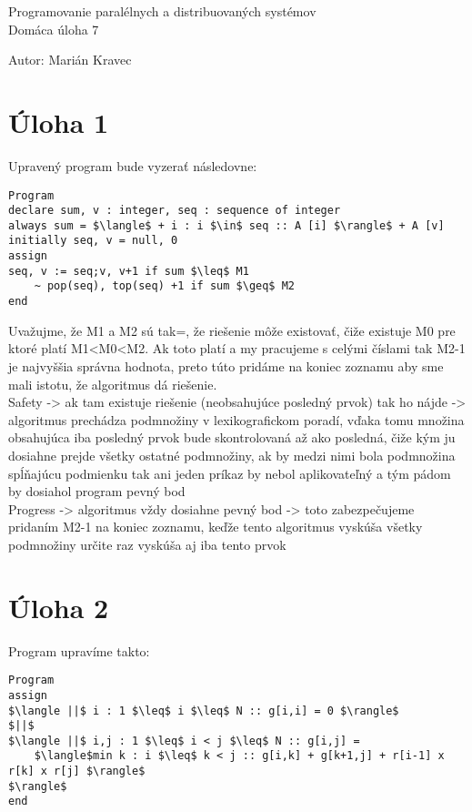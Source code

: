 \documentclass[a4paper]{article}
\begin{document}
 
	
\pagestyle{plain}

\begin{center}
	\sc\large
	Programovanie paralélnych a distribuovaných systémov\\
	Domáca úloha 7
\end{center}

Autor: Marián Kravec

\section{Úloha 1}

Upravený program bude vyzerať následovne:
\begin{lstlisting}
Program
declare sum, v : integer, seq : sequence of integer
always sum = $\langle$ + i : i $\in$ seq :: A [i] $\rangle$ + A [v]
initially seq, v = null, 0
assign
seq, v := seq;v, v+1 if sum $\leq$ M1
	~ pop(seq), top(seq) +1 if sum $\geq$ M2
end
\end{lstlisting}

Uvažujme, že M1 a M2 sú tak=, že riešenie môže existovať, čiže existuje M0 pre ktoré platí M1<M0<M2. Ak toto platí a my pracujeme s celými číslami tak M2-1 je najvyššia správna hodnota, preto túto pridáme na koniec zoznamu aby sme mali istotu, že algoritmus dá riešenie.
\\

Safety -> ak tam existuje riešenie (neobsahujúce posledný prvok) tak ho nájde -> algoritmus prechádza podmnožiny v lexikografickom poradí, vďaka tomu množina obsahujúca iba posledný prvok bude skontrolovaná až ako posledná, čiže kým ju dosiahne prejde všetky ostatné podmnožiny, ak by medzi nimi bola podmnožina spĺňajúcu podmienku tak ani jeden príkaz by nebol aplikovateľný a tým pádom by dosiahol program pevný bod
\\

Progress -> algoritmus vždy dosiahne pevný bod -> toto zabezpečujeme pridaním M2-1 na koniec zoznamu, keďže tento algoritmus vyskúša všetky podmnožiny určite raz vyskúša aj iba tento prvok 

\section{Úloha 2}

Program upravíme takto:

\begin{lstlisting}
Program
assign
$\langle ||$ i : 1 $\leq$ i $\leq$ N :: g[i,i] = 0 $\rangle$
$||$
$\langle ||$ i,j : 1 $\leq$ i < j $\leq$ N :: g[i,j] =
	$\langle$min k : i $\leq$ k < j :: g[i,k] + g[k+1,j] + r[i-1] x r[k] x r[j] $\rangle$
$\rangle$
end
\end{lstlisting}
\end{document}
